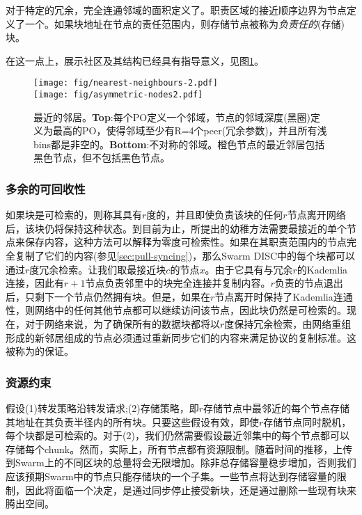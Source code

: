 对于特定的冗余，完全连通邻域的面积定义了。职责区域的接近顺序边界为节点定义了一个。如果块地址在节点的责任范围内，则存储节点被称为\emph{负责任的}(存储)块。

在这一点上，展示社区及其结构已经具有指导意义，见图\ref{fig:nearest-neighbours}。 

\begin{figure}[htbp]
   \centering
   \texttt{[image: fig/nearest-neighbours-2.pdf]} \\\texttt{[image: fig/asymmetric-nodes2.pdf]}
   \caption[最近的邻居\statusgreen]{最近的邻居。\textbf{Top}:每个PO定义一个邻域，节点的邻域深度(黑圈)定义为最高的PO，使得邻域至少有R=4个peer(冗余参数)，并且所有浅bins都是非空的。\textbf{Bottom}:不对称的邻域。橙色节点的最近邻居包括黑色节点，但不包括黑色节点。}
   \label{fig:nearest-neighbours}
\end{figure}


\subsubsection{多余的可回收性}

如果块是可检索的，则称其具有$r$度的，并且即使负责该块的任何$r$节点离开网络后，该块仍将保持这种状态。到目前为止，所提出的幼稚方法需要最接近的单个节点来保存内容，这种方法可以解释为零度可检索性。如果在其职责范围内的节点完全复制了它们的内容(参见\ref{sec:pull-syncing})，那么Swarm DISC中的每个块都可以通过$r$度冗余检索。让我们取最接近块$c$的节点$x$。由于它具有与冗余$r$的Kademlia连接，因此有$r+1$节点负责邻里中的块完全连接并复制内容。$r$负责的节点退出后，只剩下一个节点仍然拥有块。但是，如果在$r$节点离开时保持了Kademlia连通性，则网络中的任何其他节点都可以继续访问该节点，因此块仍然是可检索的。现在，对于网络来说，为了确保所有的数据块都将以$r$度保持冗余检索，由网络重组形成的新邻居组成的节点必须通过重新同步它们的内容来满足协议的复制标准。这被称为的保证。

\subsubsection{资源约束}

假设(1)转发策略沿转发请求;(2)存储策略，即$r$存储节点中最邻近的每个节点存储其地址在其负责半径内的所有块。只要这些假设有效，即使$r$存储节点同时脱机，每个块都是可检索的。对于(2)，我们仍然需要假设最近邻集中的每个节点都可以存储每个chunk。然而，实际上，所有节点都有资源限制。随着时间的推移，上传到Swarm上的不同区块的总量将会无限增加。除非总存储容量稳步增加，否则我们应该预期Swarm中的节点只能存储块的一个子集。一些节点将达到存储容量的限制，因此将面临一个决定，是通过同步停止接受新块，还是通过删除一些现有块来腾出空间。

